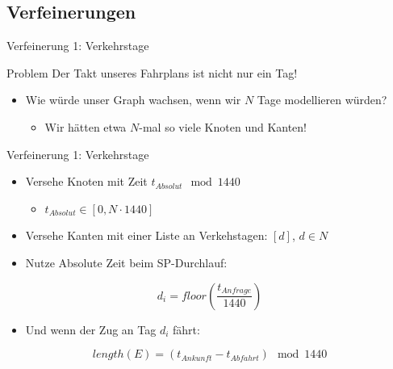 \subsection{Verfeinerungen}
\begin{frame}{Verfeinerung 1: Verkehrstage}
	\begin{block}{Problem}
		Der Takt unseres Fahrplans ist nicht nur ein Tag!
	\end{block}

	\begin{itemize}
		\item Wie würde unser Graph wachsen, wenn wir $N$ Tage modellieren würden?
		\begin{itemize}
			\item Wir hätten etwa $N$-mal so viele Knoten und Kanten!
		\end{itemize}
	\end{itemize}

\end{frame}


\begin{frame}{Verfeinerung 1: Verkehrstage}
	\begin{itemize}
		\item Versehe Knoten mit Zeit $t_{Absolut} \mod 1440$
		\begin{itemize}
			\item $t_{Absolut} \in [0, N \cdot 1440]$
		\end{itemize}
		\item Versehe Kanten mit einer Liste an Verkehstagen: $[d]$, $d \in N$
		\item Nutze Absolute Zeit beim SP-Durchlauf:
	\end{itemize}

	\begin{equation*}
		d_i = floor(\frac{t_{Anfrage}}{1440})
	\end{equation*}

	\begin{itemize}
		\item Und wenn der Zug an Tag $d_i$ fährt:
	\end{itemize}

	\begin{equation*}
		length(E) = (t_{Ankunft} - t_{Abfahrt}) \mod 1440
	\end{equation*}
\end{frame}


